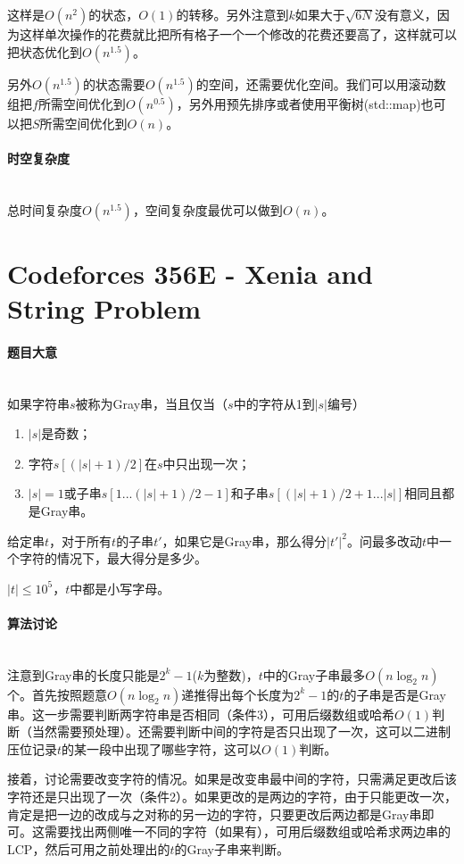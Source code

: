\documentclass[UTF8]{ctexart}
\newcommand{\myparagraph}[1]{\paragraph{#1}\mbox{}\\}
\theoremstyle{nonumberplain}
\begin{document}
			这样是$O(n^2)$的状态，$O(1)$的转移。另外注意到$k$如果大于$\sqrt{6N}$没有意义，因为这样单次操作的花费就比把所有格子一个一个修改的花费还要高了，这样就可以把状态优化到$O(n^{1.5})$。
			
			另外$O(n^{1.5})$的状态需要$O(n^{1.5})$的空间，还需要优化空间。我们可以用滚动数组把$f$所需空间优化到$O(n^{0.5})$，另外用预先排序或者使用平衡树(std::map)也可以把$S$所需空间优化到$O(n)$。
		
		\myparagraph{时空复杂度}
		
			总时间复杂度$O(n^{1.5})$，空间复杂度最优可以做到$O(n)$。
	
	\section{Codeforces 356E - Xenia and String Problem}
	
		\myparagraph{题目大意}
		
			如果字符串$s$被称为Gray串，当且仅当（$s$中的字符从1到$|s|$编号）
			
			\begin{enumerate}
				\item $|s|$是奇数；
				\item 字符$s[(|s|+1)/2]$在$s$中只出现一次；
				\item $|s|=1$或子串$s[1...(|s|+1)/2-1]$和子串$s[(|s|+1)/2+1...|s|]$相同且都是Gray串。
			\end{enumerate}
			
			给定串$t$，对于所有$t$的子串$t'$，如果它是Gray串，那么得分$|t'|^2$。问最多改动$t$中一个字符的情况下，最大得分是多少。
			
			$|t| \leq 10^5$，$t$中都是小写字母。
		
		\myparagraph{算法讨论}
		
			注意到Gray串的长度只能是$2^k-1$($k$为整数)，$t$中的Gray子串最多$O(n\log_2n)$个。首先按照题意$O(n\log_2n)$递推得出每个长度为$2^k-1$的$t$的子串是否是Gray串。这一步需要判断两字符串是否相同（条件3），可用后缀数组或哈希$O(1)$判断（当然需要预处理）。还需要判断中间的字符是否只出现了一次，这可以二进制压位记录$t$的某一段中出现了哪些字符，这可以$O(1)$判断。
			
			接着，讨论需要改变字符的情况。如果是改变串最中间的字符，只需满足更改后该字符还是只出现了一次（条件2）。如果更改的是两边的字符，由于只能更改一次，肯定是把一边的改成与之对称的另一边的字符，只要更改后两边都是Gray串即可。这需要找出两侧唯一不同的字符（如果有），可用后缀数组或哈希求两边串的LCP，然后可用之前处理出的$t$的Gray子串来判断。
			
\end{document}
